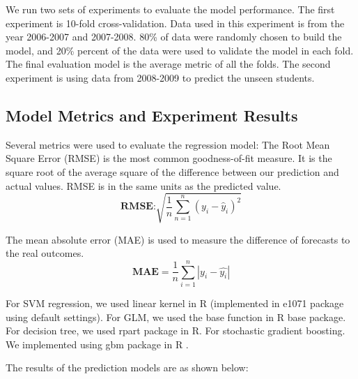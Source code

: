 \documentclass[12pt,english]{report}
\begin{document}
    
We run two sets of experiments to evaluate the model performance. The first
experiment
is 10-fold cross-validation. Data used in this experiment is from the year
2006-2007 
and 2007-2008.  80\% of data were randomly chosen to build the model, and 20\%
percent
of the data were used to validate the model in each fold. The final evaluation
model
is the average metric of all the folds. The second experiment is using data
from
2008-2009 to predict the unseen students.
    
\subsection{Model Metrics and Experiment Results}
Several metrics were used to evaluate the regression model:
The Root Mean Square Error (RMSE) is the most common goodness-of-fit measure.
It is 
the square root of the average square of the difference between our prediction
and 
actual values. RMSE is in the same units as the predicted value.
\begin{equation}
\textbf{RMSE:}  \sqrt{\frac{1}{n}\sum_{n=1}^n (y_i-\hat{y}_i)^2}
\end{equation}

The mean absolute error (MAE) is used to measure the difference of forecasts to
the
real outcomes.
\begin{equation}
\textbf{MAE} = \frac{1}{n}\sum_{i=1}^n \left| y_i - \hat{y_i}\right| 
\end{equation}


For SVM regression, we used linear kernel in R (implemented in e1071 package
\citep{e1071} 
using default settings). For GLM, we used the base function in R base package.
For decision tree, we used rpart package \citep{rpart} in R. For stochastic
gradient
boosting. We implemented using gbm package in R \citep{gbm}.
 
The results of the prediction models are as shown below:
\end{document}
